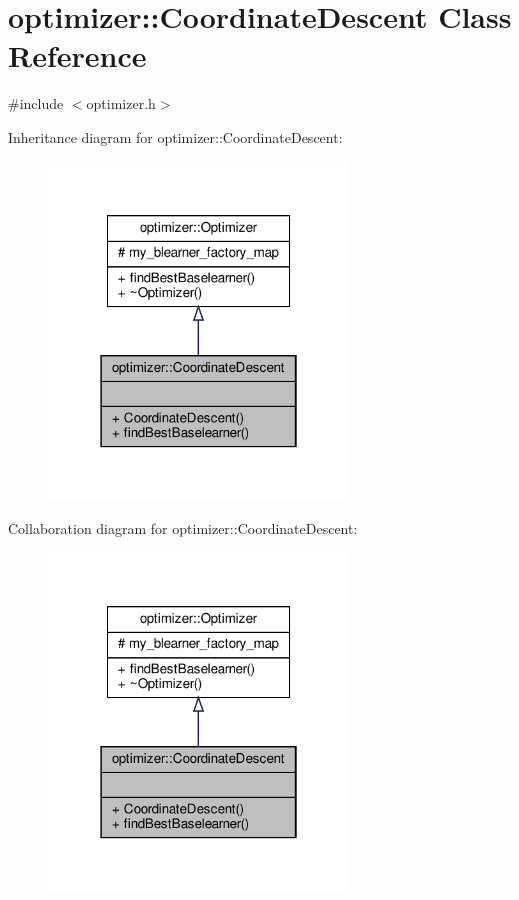 \hypertarget{classoptimizer_1_1_coordinate_descent}{}\section{optimizer\+:\+:Coordinate\+Descent Class Reference}
\label{classoptimizer_1_1_coordinate_descent}


{\ttfamily \#include $<$optimizer.\+h$>$}



Inheritance diagram for optimizer\+:\+:Coordinate\+Descent\+:\nopagebreak
\begin{figure}[H]
\begin{center}
\leavevmode
\includegraphics[width=226pt]{classoptimizer_1_1_coordinate_descent__inherit__graph}
\end{center}
\end{figure}


Collaboration diagram for optimizer\+:\+:Coordinate\+Descent\+:\nopagebreak
\begin{figure}[H]
\begin{center}
\leavevmode
\includegraphics[width=226pt]{classoptimizer_1_1_coordinate_descent__coll__graph}
\end{center}
\end{figure}
